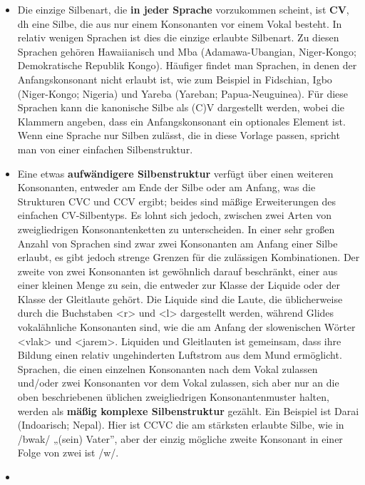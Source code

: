 \documentclass[
  letterpaper,
]{scrbook}
\begin{document}
\begin{itemize}
\item
  Die einzige Silbenart, die \textbf{in jeder Sprache} vorzukommen
  scheint, ist \textbf{CV}, dh eine Silbe, die aus nur einem Konsonanten
  vor einem Vokal besteht. In relativ wenigen Sprachen ist dies die
  einzige erlaubte Silbenart. Zu diesen Sprachen gehören Hawaiianisch
  und Mba (Adamawa-Ubangian, Niger-Kongo; Demokratische Republik Kongo).
  Häufiger findet man Sprachen, in denen der Anfangskonsonant nicht
  erlaubt ist, wie zum Beispiel in Fidschian, Igbo (Niger-Kongo;
  Nigeria) und Yareba (Yareban; Papua-Neuguinea). Für diese Sprachen
  kann die kanonische Silbe als (C)V dargestellt werden, wobei die
  Klammern angeben, dass ein Anfangskonsonant ein optionales Element
  ist. Wenn eine Sprache nur Silben zulässt, die in diese Vorlage
  passen, spricht man von einer einfachen Silbenstruktur.
\item
  Eine etwas \textbf{aufwändigere Silbenstruktur} verfügt über einen
  weiteren Konsonanten, entweder am Ende der Silbe oder am Anfang, was
  die Strukturen CVC und CCV ergibt; beides sind mäßige Erweiterungen
  des einfachen CV-Silbentyps. Es lohnt sich jedoch, zwischen zwei Arten
  von zweigliedrigen Konsonantenketten zu unterscheiden. In einer sehr
  großen Anzahl von Sprachen sind zwar zwei Konsonanten am Anfang einer
  Silbe erlaubt, es gibt jedoch strenge Grenzen für die zulässigen
  Kombinationen. Der zweite von zwei Konsonanten ist gewöhnlich darauf
  beschränkt, einer aus einer kleinen Menge zu sein, die entweder zur
  Klasse der Liquide oder der Klasse der Gleitlaute gehört. Die Liquide
  sind die Laute, die üblicherweise durch die Buchstaben
  \textless r\textgreater{} und \textless l\textgreater{} dargestellt
  werden, während Glides vokalähnliche Konsonanten sind, wie die am
  Anfang der slowenischen Wörter \textless vlak\textgreater{} und
  \textless jarem\textgreater. Liquiden und Gleitlauten ist gemeinsam,
  dass ihre Bildung einen relativ ungehinderten Luftstrom aus dem Mund
  ermöglicht. Sprachen, die einen einzelnen Konsonanten nach dem Vokal
  zulassen und/oder zwei Konsonanten vor dem Vokal zulassen, sich aber
  nur an die oben beschriebenen üblichen zweigliedrigen
  Konsonantenmuster halten, werden als \textbf{mäßig komplexe
  Silbenstruktur} gezählt. Ein Beispiel ist Darai (Indoarisch; Nepal).
  Hier ist CCVC die am stärksten erlaubte Silbe, wie in /bwak/ „(sein)
  Vater'', aber der einzig mögliche zweite Konsonant in einer Folge von
  zwei ist /w/.
\item

\end{itemize}
\end{document}
